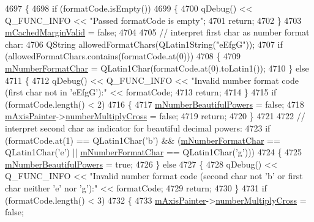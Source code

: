 \begin{DoxyCode}
4697 \{
4698   \textcolor{keywordflow}{if} (formatCode.isEmpty())
4699   \{
4700     qDebug() << Q\_FUNC\_INFO << \textcolor{stringliteral}{"Passed formatCode is empty"};
4701     \textcolor{keywordflow}{return};
4702   \}
4703   \hyperlink{class_q_c_p_axis_a2cde37b6e385f47e11322df4ac1b0e9b}{mCachedMarginValid} = \textcolor{keyword}{false};
4704   
4705   \textcolor{comment}{// interpret first char as number format char:}
4706   QString allowedFormatChars(QLatin1String(\textcolor{stringliteral}{"eEfgG"}));
4707   \textcolor{keywordflow}{if} (allowedFormatChars.contains(formatCode.at(0)))
4708   \{
4709     \hyperlink{class_q_c_p_axis_a39594313deef458f425bba25cd337a8a}{mNumberFormatChar} = QLatin1Char(formatCode.at(0).toLatin1());
4710   \} \textcolor{keywordflow}{else}
4711   \{
4712     qDebug() << Q\_FUNC\_INFO << \textcolor{stringliteral}{"Invalid number format code (first char not in 'eEfgG'):"} << formatCode;
4713     \textcolor{keywordflow}{return};
4714   \}
4715   \textcolor{keywordflow}{if} (formatCode.length() < 2)
4716   \{
4717     \hyperlink{class_q_c_p_axis_af03809bee3f3e35fcc38d25b6dd5003b}{mNumberBeautifulPowers} = \textcolor{keyword}{false};
4718     \hyperlink{class_q_c_p_axis_aeeae00935bd2dab82d64f32544a90913}{mAxisPainter}->\hyperlink{class_q_c_p_axis_painter_private_a0deb7524009140f00a774dfd286d002c}{numberMultiplyCross} = \textcolor{keyword}{false};
4719     \textcolor{keywordflow}{return};
4720   \}
4721   
4722   \textcolor{comment}{// interpret second char as indicator for beautiful decimal powers:}
4723   \textcolor{keywordflow}{if} (formatCode.at(1) == QLatin1Char(\textcolor{charliteral}{'b'}) && (\hyperlink{class_q_c_p_axis_a39594313deef458f425bba25cd337a8a}{mNumberFormatChar} == QLatin1Char(\textcolor{charliteral}{'e'}) || 
      \hyperlink{class_q_c_p_axis_a39594313deef458f425bba25cd337a8a}{mNumberFormatChar} == QLatin1Char(\textcolor{charliteral}{'g'})))
4724   \{
4725     \hyperlink{class_q_c_p_axis_af03809bee3f3e35fcc38d25b6dd5003b}{mNumberBeautifulPowers} = \textcolor{keyword}{true};
4726   \} \textcolor{keywordflow}{else}
4727   \{
4728     qDebug() << Q\_FUNC\_INFO << \textcolor{stringliteral}{"Invalid number format code (second char not 'b' or first char neither 'e'
       nor 'g'):"} << formatCode;
4729     \textcolor{keywordflow}{return};
4730   \}
4731   \textcolor{keywordflow}{if} (formatCode.length() < 3)
4732   \{
4733     \hyperlink{class_q_c_p_axis_aeeae00935bd2dab82d64f32544a90913}{mAxisPainter}->\hyperlink{class_q_c_p_axis_painter_private_a0deb7524009140f00a774dfd286d002c}{numberMultiplyCross} = \textcolor{keyword}{false};

\end{DoxyCode}
